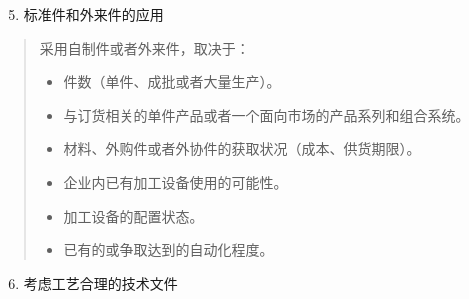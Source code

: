 \documentclass[letterpaper,10pt,english]{sphinxmanual}
\begin{document}
\begin{enumerate}
\setcounter{enumi}{4}
\item {} 
标准件和外来件的应用

\end{enumerate}
\begin{quote}

采用自制件或者外来件，取决于：
\begin{itemize}
\item {} 
件数（单件、成批或者大量生产）。

\item {} 
与订货相关的单件产品或者一个面向市场的产品系列和组合系统。

\item {} 
材料、外购件或者外协件的获取状况（成本、供货期限）。

\item {} 
企业内已有加工设备使用的可能性。

\item {} 
加工设备的配置状态。

\item {} 
已有的或争取达到的自动化程度。

\end{itemize}
\end{quote}
\begin{enumerate}
\setcounter{enumi}{5}
\item {} 
考虑工艺合理的技术文件

\end{enumerate}
\end{document}
